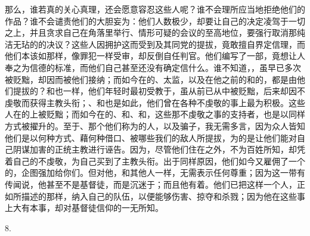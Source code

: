 \par

那么，谁若真的关心真理，还会愿意容忍这些人呢？谁不会理所应当地拒绝他们的作品？谁不会谴责他们的大胆妄为：他们人数极少，却要让自己的决定凌驾于一切之上，并且贪求自己在角落里举行、情形可疑的会议的至高地位，要强行取消那纯洁无玷的的决议？这些人因拥护这而受到及其同党的提拔，竟敢擅自界定信理，而他们本该如那样，像罪犯一样受审，却反倒自任判官。他们编写了一部，竟想让人奉之为信德的标准，而他们自己甚至还没有确定信什么。谁不知道，，虽早已多次被贬黜，却因而被他们接纳；而如今在的、太监，以及在他之前的和的，都是由他们提拔的？和也一样，他们年轻时最初受教于，虽从前已从中被贬黜，后来却因不虔敬而获得主教头衔；、和也是如此，他们曾在各种不虔敬的事上最为积极。这些人在的上被贬黜；而如今在的、和、和，这些那不虔敬之事的支持者，也是以同样方式被擢升的。至于、那个他们称为的人，以及骗子，我无需多言，因为众人皆知他们是以何种方式、藉何种借口、被哪些我们的敌人所提拔，为的是让他们能对自己阴谋加害的正统主教进行诬告。因为，尽管他们住在之外，不为百姓所知，却凭着自己的不虔敬，为自己买到了主教头衔。出于同样原因，他们如今又雇佣了一个的，企图强加给你们。但对他，和其他人一样，无需表示任何尊重；因为这一带有传闻说，他甚至不是基督徒，而是沉迷于；而且他有着。他们已把这样一个人，正如所描述的那样，纳入自己的队伍，以便能够伤害、掠夺和杀戮；因为他在这些事上大有本事，却对基督徒信仰的一无所知。\par

8. \par


